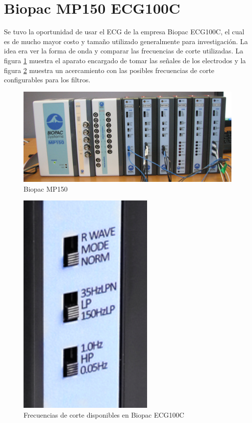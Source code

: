 \section{Biopac MP150 ECG100C}
Se tuvo la oportunidad de usar el ECG de la empresa Biopac ECG100C, el cual es de mucho mayor costo y tamaño utilizado generalmente para investigación. La idea era ver la forma de onda y comparar las frecuencias de corte utilizadas. La figura \ref{biopac} muestra el aparato encargado de tomar las señales de los electrodos y la figura \ref{frecuencias} muestra un acercamiento con las posibles frecuencias de corte configurables para los filtros.\\

\begin{figure}[H]
\centering
\includegraphics[scale=0.7]{figuras/ecg/biopac.jpg}
\caption{Biopac MP150}
\label{biopac}
\end{figure}

\begin{figure}[H]
\centering
\includegraphics[scale=0.7]{figuras/ecg/biopacecg.png}
\caption{Frecuencias de corte disponibles en Biopac ECG100C}
\label{frecuencias}
\end{figure}

